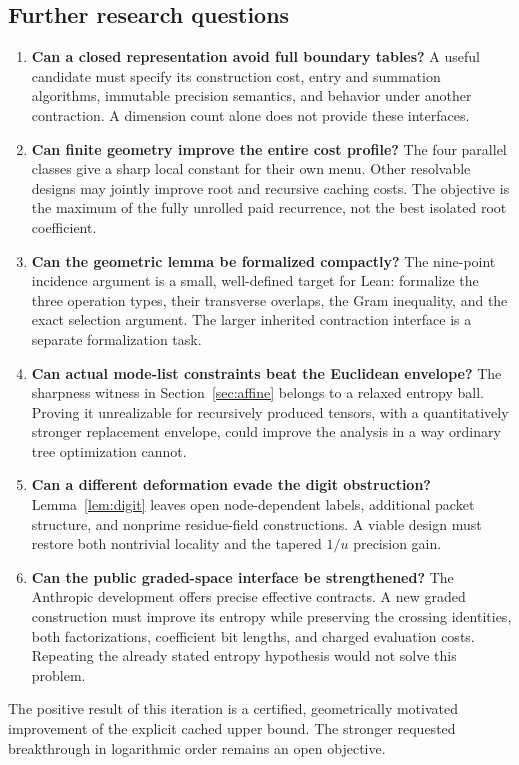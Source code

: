 \subsection{Further research questions}
\begin{enumerate}
\item \textbf{Can a closed representation avoid full boundary tables?}
  A useful candidate must specify its construction cost, entry and summation
  algorithms, immutable precision semantics, and behavior under another
  contraction. A dimension count alone does not provide these interfaces.
\item \textbf{Can finite geometry improve the entire cost profile?}
  The four parallel classes give a sharp local constant for their own menu.
  Other resolvable designs may jointly improve root and recursive caching
  costs. The objective is the maximum of the fully unrolled paid recurrence,
  not the best isolated root coefficient.
\item \textbf{Can the geometric lemma be formalized compactly?}
  The nine-point incidence argument is a small, well-defined target for Lean:
  formalize the three operation types, their transverse overlaps, the Gram
  inequality, and the exact selection argument. The larger inherited
  contraction interface is a separate formalization task.
\item \textbf{Can actual mode-list constraints beat the Euclidean envelope?}
  The sharpness witness in Section~\ref{sec:affine} belongs to a relaxed
  entropy ball. Proving it unrealizable for recursively produced tensors,
  with a quantitatively stronger replacement envelope, could improve the
  analysis in a way ordinary tree optimization cannot.
\item \textbf{Can a different deformation evade the digit obstruction?}
  Lemma~\ref{lem:digit} leaves open node-dependent labels, additional packet
  structure, and nonprime residue-field constructions. A viable design must
  restore both nontrivial locality and the tapered $1/u$ precision gain.
\item \textbf{Can the public graded-space interface be strengthened?}
  The Anthropic development offers precise effective contracts. A new
  graded construction must improve its entropy while preserving the crossing
  identities, both factorizations, coefficient bit lengths, and charged
  evaluation costs. Repeating the already stated entropy hypothesis would
  not solve this problem.
\end{enumerate}

The positive result of this iteration is a certified, geometrically motivated
improvement of the explicit cached upper bound. The stronger requested
breakthrough in logarithmic order remains an open objective.
